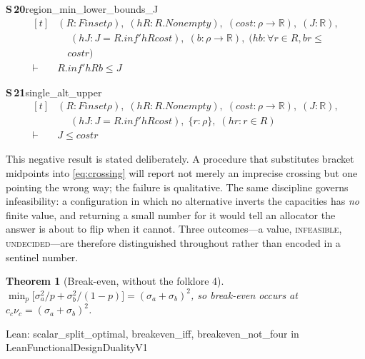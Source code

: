 \documentclass[conference]{IEEEtran}
\newtheorem{theorem}{Theorem}
\theoremstyle{definition}
\newcommand{\lean}[1]{\textsf{\footnotesize #1}}
\newcommand{\leanbox}[1]{%
  \par\vspace{2pt}\noindent
  {\footnotesize\textsf{Lean: #1}}\par\vspace{2pt}}
\begin{document}
\noindent\textbf{S\,20}\quad\lean{region\_min\_lower\_bounds\_J}
{\footnotesize\[ \begin{aligned}[t]
&(\mathit{R} : \mathit{Finset} \rho ),\; (\mathit{hR} : \mathit{R}.\mathit{Nonempty}),\; (\mathit{cost} : \rho \to \mathbb{R} ),\; (\mathit{J} : \mathbb{R} ),\\
&\quad \; (\mathit{hJ} : \mathit{J} = \mathit{R}.\mathit{inf'} \mathit{hR} \mathit{cost}),\; (\mathit{b} : \rho \to \mathbb{R} ),\; (\mathit{hb} : \forall \mathit{r} \in \mathit{R}, \mathit{b} \mathit{r} \leq\\
&\quad \mathit{cost} \mathit{r})\\
\vdash\;&\mathit{R}.\mathit{inf'} \mathit{hR} \mathit{b} \leq \mathit{J}
\end{aligned} \]}

\noindent\textbf{S\,21}\quad\lean{single\_alt\_upper}
{\footnotesize\[ \begin{aligned}[t]
&(\mathit{R} : \mathit{Finset} \rho ),\; (\mathit{hR} : \mathit{R}.\mathit{Nonempty}),\; (\mathit{cost} : \rho \to \mathbb{R} ),\; (\mathit{J} : \mathbb{R} ),\\
&\quad \; (\mathit{hJ} : \mathit{J} = \mathit{R}.\mathit{inf'} \mathit{hR} \mathit{cost}),\; \{ \mathit{r} : \rho \},\; (\mathit{hr} : \mathit{r} \in \mathit{R})\\
\vdash\;&\mathit{J} \leq \mathit{cost} \mathit{r}
\end{aligned} \]}


This negative result is stated deliberately. A procedure that substitutes bracket midpoints
into \eqref{eq:crossing} will report not merely an imprecise crossing but one pointing the
wrong way; the failure is qualitative. The same discipline governs infeasibility: a
configuration in which no alternative inverts the capacities has \emph{no} finite value, and
returning a small number for it would tell an allocator the answer is about to flip when it
cannot. Three outcomes---a value, \textsc{infeasible}, \textsc{undecided}---are therefore
distinguished throughout rather than encoded in a sentinel number.

\begin{theorem}[Break-even, without the folklore 4]
\label{thm:breakeven}
$\min_{p}\bigl[\sigma_{a}^{2}/p+\sigma_{b}^{2}/(1-p)\bigr]=(\sigma_{a}+\sigma_{b})^{2}$, so
break-even occurs at $c_{c}\nu_{c}=(\sigma_{a}+\sigma_{b})^{2}$.
\end{theorem}

\leanbox{\lean{scalar\_split\_optimal}, \lean{breakeven\_iff}, \lean{breakeven\_not\_four}
in \lean{LeanFunctionalDesignDualityV1}}
\end{document}
